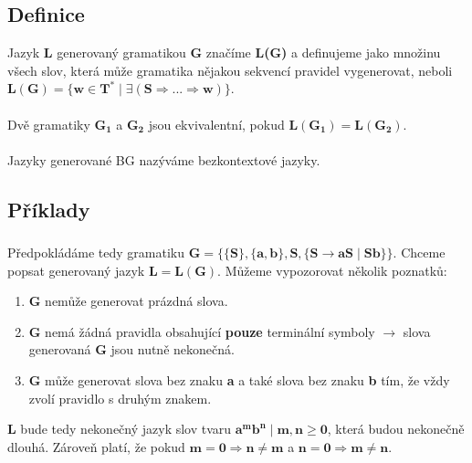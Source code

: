 \documentclass{report}
\begin{document}
\subsection*{Definice}
Jazyk \textbf{L} generovaný gramatikou \textbf{G} značíme \textbf{L(G)} a definujeme jako množinu všech slov, která může gramatika nějakou sekvencí pravidel vygenerovat, neboli $\mathbf{L(G)=\{w \in T^* \mid \exists(S \Rightarrow ... \Rightarrow w)\}}$.\\ \\
Dvě gramatiky $\mathbf{G_1}$ a $\mathbf{G_2}$ jsou ekvivalentní, pokud $\mathbf{L(G_1)=L(G_2)}$.\\ \\
Jazyky generované BG nazýváme bezkontextové jazyky.
\pagebreak
\subsection*{Příklady}
\subsubsection*{}
Předpokládáme tedy gramatiku $\mathbf{G = \{\{S\},\{a,b\},S,\{S \rightarrow aS \mid Sb\}\}}$. Chceme popsat generovaný jazyk $\mathbf{L=L(G)}$. Můžeme vypozorovat několik poznatků:
\begin{enumerate}
    \item \textbf{G} nemůže generovat prázdná slova.
    \item \textbf{G} nemá žádná pravidla obsahující \textbf{pouze} terminální symboly $\rightarrow$ slova generovaná \textbf{G} jsou nutně nekonečná.
    \item \textbf{G} může generovat slova bez znaku \textbf{a} a také slova bez znaku \textbf{b} tím, že vždy zvolí pravidlo s druhým znakem.
\end{enumerate}
\textbf{L} bude tedy nekonečný jazyk slov tvaru $\mathbf{a^mb^n \mid m,n\ge0}$, která budou nekonečně dlouhá. Zároveň platí, že pokud $\mathbf{m=0 \Rightarrow n\neq{m}}$ a $\mathbf{n=0 \Rightarrow m\neq{n}}$.
\end{document}
